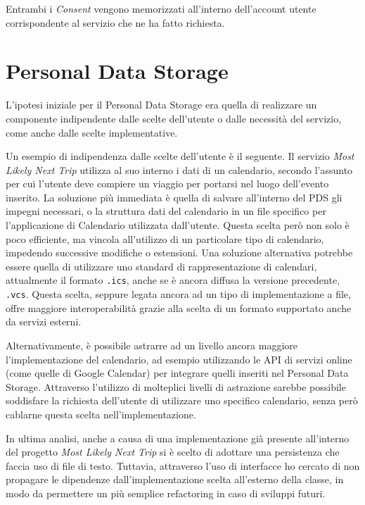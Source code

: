Entrambi i \textit{Consent} vengono memorizzati all’interno dell’account utente corrispondente al servizio che ne ha fatto richiesta.

\section{Personal Data Storage}
L’ipotesi iniziale per il Personal Data Storage era quella di realizzare un componente indipendente dalle scelte dell’utente o dalle necessit\`a del servizio, come anche dalle scelte implementative. 

Un esempio di indipendenza dalle scelte dell’utente \`e il seguente. Il servizio \textit{Most Likely Next Trip} utilizza al suo interno i dati di un calendario, secondo l’assunto per cui l’utente deve compiere un viaggio per portarsi nel luogo dell’evento inserito. La soluzione pi\`u immediata \`e quella di salvare all’interno del PDS gli impegni necessari, o la struttura dati del calendario in un file specifico per l’applicazione di Calendario utilizzata dall’utente. Questa scelta per\`o non solo \`e poco efficiente, ma vincola all’utilizzo di un particolare tipo di calendario, impedendo successive modifiche o estensioni. Una soluzione alternativa potrebbe essere quella di utilizzare uno standard di rappresentazione di calendari, attualmente il formato \texttt{.ics}, anche se \`e ancora diffusa la versione precedente, \texttt{.vcs}. Questa scelta, seppure legata ancora ad un tipo di implementazione a file, offre maggiore interoperabilit\`a grazie alla scelta di un formato supportato anche da servizi esterni.

Alternativamente, \`e possibile astrarre ad un livello ancora maggiore l’implementazione del calendario, ad esempio utilizzando le API di servizi online (come quelle di Google Calendar\cite{googlecalendarapi}) per integrare quelli inseriti nel Personal Data Storage. Attraverso l’utilizzo di molteplici livelli di astrazione sarebbe possibile soddisfare la richiesta dell’utente di utilizzare uno specifico calendario, senza per\`o cablarne questa scelta nell’implementazione.

In ultima analisi, anche a causa di una implementazione gi\`a presente all’interno del progetto \textit{Most Likely Next Trip} si \`e scelto di adottare una persistenza che faccia uso di file di testo. Tuttavia, attraverso l’uso di interfacce ho cercato di non propagare le dipendenze dall’implementazione scelta all’esterno della classe, in modo da permettere un pi\`u semplice refactoring in caso di sviluppi futuri.

